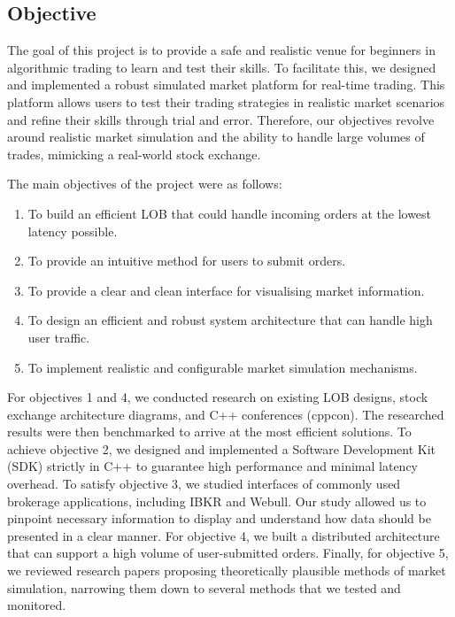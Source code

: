 \documentclass[12pt,a4paper]{article}
\begin{document}
\subsection{Objective}
The goal of this project is to provide a safe and realistic venue for beginners in algorithmic trading to learn and test their skills. To facilitate this, we designed and implemented a robust simulated market platform for real-time trading. This platform allows users to test their trading strategies in realistic market scenarios and refine their skills through trial and error. Therefore, our objectives revolve around realistic market simulation and the ability to handle large volumes of trades, mimicking a real-world stock exchange.

The main objectives of the project were as follows:

\begin{enumerate}
    \item To build an efficient LOB that could handle incoming orders at the lowest latency possible.
    \item To provide an intuitive method for users to submit orders.
    \item To provide a clear and clean interface for visualising market information.
    \item To design an efficient and robust system architecture that can handle high user traffic.
    \item To implement realistic and configurable market simulation mechanisms.
\end{enumerate}

For objectives 1 and 4, we conducted research on existing LOB designs, stock exchange architecture diagrams, and C++ conferences (cppcon). The researched results were then benchmarked to arrive at the most efficient solutions. To achieve objective 2, we designed and implemented a Software Development Kit (SDK) strictly in C++ to guarantee high performance and minimal latency overhead. To satisfy objective 3, we studied interfaces of commonly used brokerage applications, including IBKR and Webull. Our study allowed us to pinpoint necessary information to display and understand how data should be presented in a clear manner. For objective 4, we built a distributed architecture that can support a high volume of user-submitted orders. Finally, for objective 5, we reviewed research papers proposing theoretically plausible methods of market simulation, narrowing them down to several methods that we tested and monitored.
\end{document}
